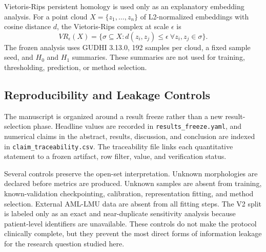 Vietoris-Rips persistent homology is used only as an explanatory embedding analysis. For a point cloud $X=\{z_1,\ldots,z_n\}$ of L2-normalized embeddings with cosine distance $d$, the Vietoris-Rips complex at scale $\epsilon$ is
\[
VR_\epsilon(X)=\{\sigma\subseteq X: d(z_i,z_j)\leq \epsilon\ \forall z_i,z_j\in\sigma\}.
\]
The frozen analysis uses GUDHI 3.13.0, 192 samples per cloud, a fixed sample seed, and $H_0$ and $H_1$ summaries. These summaries are not used for training, thresholding, prediction, or method selection.

\subsection{Reproducibility and Leakage Controls}

The manuscript is organized around a result freeze rather than a new result-selection phase. Headline values are recorded in \texttt{results\_freeze.yaml}, and numerical claims in the abstract, results, discussion, and conclusion are indexed in \texttt{claim\_traceability.csv}. The traceability file links each quantitative statement to a frozen artifact, row filter, value, and verification status.

Several controls preserve the open-set interpretation. Unknown morphologies are declared before metrics are produced. Unknown samples are absent from training, known-validation checkpointing, calibration, representation fitting, and method selection. External AML-LMU data are absent from all fitting steps. The V2 split is labeled only as an exact and near-duplicate sensitivity analysis because patient-level identifiers are unavailable. These controls do not make the protocol clinically complete, but they prevent the most direct forms of information leakage for the research question studied here.

